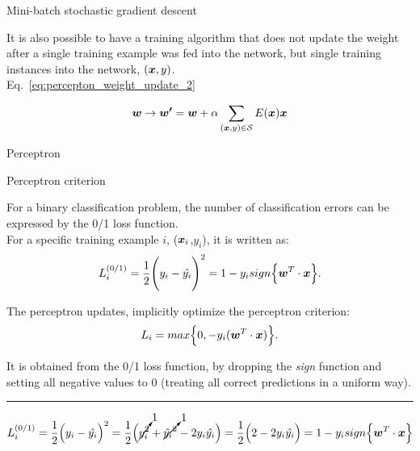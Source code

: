 \begin{frame}[t]{Mini-batch stochastic gradient descent}

    It is also possible to have a training algorithm that does not 
    update the weight after a single training example was fed into the network,
    but 
    single training instances into the network,  $(\boldsymbol{x},y)$.\\

    Eq.~\ref{eq:percepton_weight_update_2} 

    \begin{equation}
        \boldsymbol{w} \rightarrow \boldsymbol{w^\prime} = 
          \boldsymbol{w} + \alpha \sum_{(\boldsymbol{x},y) \in \mathcal{S}} E(\boldsymbol{x}) \boldsymbol{x}
        \label{eq:percepton_weight_update_minibatch_1}
      \end{equation}

\end{frame}

%
%
%

\begin{frame}[t]{Perceptron}


\end{frame}

%
%
%

\begin{frame}[t]{Perceptron criterion}

    For a binary classification problem, 
    the number of classification errors can be expressed by the
    \gls{0/1 loss function}.\\
    \vspace{0.3cm}
    For a specific training example $i$, 
    ($\boldsymbol{x}_i$,$y_i$), it is written as:
    \begin{equation}
        L_{i}^{(0/1)} = 
          \frac{1}{2} \Bigg( y_i - \hat{y_i} \Bigg)^2 =
          1 - y_i sign\Big\{ \boldsymbol{w}^T \cdot \boldsymbol{x} \Big\}.
        \label{eq:percepton_01_loss_1}  
    \end{equation}

    The \gls{perceptron} updates, 
    implicitly optimize the \gls{perceptron criterion}:
    \begin{equation}
        L_{i} = 
          max\Big\{0, - y_i(\boldsymbol{w}^T \cdot \boldsymbol{x}) \Big\}.
        \label{eq:percepton_criterion_1}  
    \end{equation}

    It is obtained from the \gls{0/1 loss function}, 
    by dropping the {\em sign} function and setting all negative values to 0
    (treating all correct predictions in a uniform way).

    \noindent\rule{4cm}{0.4pt}
    {\scriptsize
        \begin{equation*}
            L_{i}^{(0/1)} = 
            \frac{1}{2} \Big( y_i - \hat{y_i} \Big)^2 =
            \frac{1}{2} \Big( \cancelto{1}{y_i^2} + \cancelto{1}{\hat{y_i}^2} - 2 y_i \hat{y_i} \Big) =          
            \frac{1}{2} \Big( 2 - 2 y_i \hat{y_i} \Big) = 
            1 - y_i sign\Big\{ \boldsymbol{w}^T \cdot \boldsymbol{x} \Big\}
        \end{equation*}     
    }
    
\end{frame}


